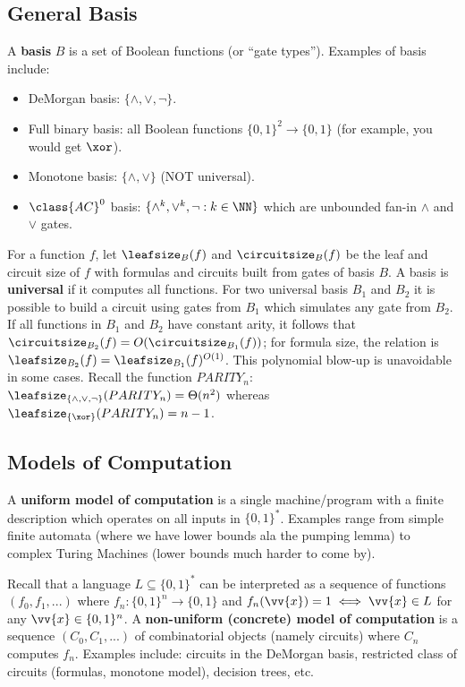 	\subsection{General Basis}
	A \textbf{basis} $B$ is a set of Boolean functions (or ``gate types''). Examples of basis include: 
	\begin{itemize}
		\item DeMorgan basis: $\{\land, \lor, \lnot\}$.
		\item Full binary basis: all Boolean functions $\{0,1\}^2 \rightarrow \{0,1\}$ (for example, you would get $\xor$).
		\item Monotone basis: $\{\land, \lor\}$ (NOT universal).
		\item $\class{AC}^0$ basis: $\{\land^{k}, \lor^k, \lnot: k \in \NN\}$ which are unbounded fan-in $\land$ and $\lor$ gates.
	\end{itemize}
	For a function $f$, let $\leafsize_B(f)$ and $\circuitsize_B(f)$ be the leaf and circuit size of $f$ with formulas and circuits built from gates of basis $B$. A basis is \textbf{universal} if it computes all functions. For two universal basis $B_1$ and $B_2$ it is possible to build a circuit using gates from $B_1$ which simulates any gate from $B_2$. If all functions in $B_1$ and $B_2$ have constant arity, it follows that $\circuitsize_{B_2}(f) = O(\circuitsize_{B_1}(f))$; for formula size, the relation is $\leafsize_{B_2}(f) = \leafsize_{B_1}(f)^{O(1)}$. This polynomial blow-up is unavoidable in some cases. Recall the function $PARITY_n$: $\leafsize_{\{\land, \lor, \lnot\}}(PARITY_n) = \Theta(n^2)$ whereas $\leafsize_{\{\xor\}}(PARITY_n) = n-1$.

	\subsection{Models of Computation}
	\label{sec:uniformvsconcrete}
	\begin{definition}
		\label{def:mmodelsofcomputation} 
		A \textbf{uniform model of computation} is a single machine/program with a finite description which operates on all inputs in $\{0,1\}^*$. Examples range from simple finite automata (where we have lower bounds ala the pumping lemma) to complex Turing Machines (lower bounds much harder to come by).
		
		Recall that a language $L \subseteq \{0,1\}^*$ can be interpreted as a sequence of functions $(f_0, f_1, ...)$ where $f_n: \{0,1\}^n \rightarrow \{0,1\}$ and $f_n(\vv{x}) = 1 \iff \vv{x} \in L$ for any $\vv{x} \in \{0,1\}^n$. A \textbf{non-uniform (concrete) model of computation} is a sequence $(C_0, C_1, ...)$ of combinatorial objects (namely circuits) where $C_n$ computes $f_n$. Examples include: circuits in the DeMorgan basis, restricted class of circuits (formulas, monotone model), decision trees, etc.  
	\end{definition}
	
